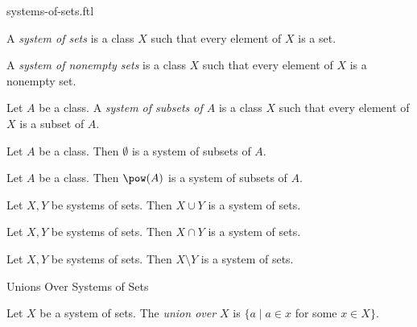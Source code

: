 \documentclass{naproche-library}
\begin{document}
\begin{smodule}[title=Systems of Sets]{systems-of-sets.ftl}

\begin{definition}[forthel,id=FOUNDATIONS_10_5805323570905088]
  A \emph{system of sets} is a class $X$ such that every element of $X$ is a set.
\end{definition}

\begin{definition}[forthel,id=FOUNDATIONS_10_1631952387964928]
  A \emph{system of nonempty sets} is a class $X$ such that every element of $X$ is a nonempty set.
\end{definition}

\begin{definition}[forthel,id=FOUNDATIONS_10_943381479948288]
  Let $A$ be a class.
  A \emph{system of subsets of $A$} is a class $X$ such that every element of $X$ is a subset of $A$.
\end{definition}

\begin{proposition}[forthel,id=FOUNDATIONS_10_8268633648136192]
  Let $A$ be a class.
  Then $\emptyset$ is a system of subsets of $A$.
\end{proposition}

\begin{proposition}[forthel,id=FOUNDATIONS_10_7546016869908480]
  Let $A$ be a class.
  Then $\pow(A)$ is a system of subsets of $A$.
\end{proposition}

\begin{proposition}
  Let $X, Y$ be systems of sets.
  Then $X \cup Y$ is a system of sets.
\end{proposition}

\begin{proposition}
  Let $X, Y$ be systems of sets.
  Then $X \cap Y$ is a system of sets.
\end{proposition}

\begin{proposition}
  Let $X, Y$ be systems of sets.
  Then $X \setminus Y$ is a system of sets.
\end{proposition}

\begin{sfragment}{Unions Over Systems of Sets}
  \begin{definition}[forthel,id=FOUNDATIONS_10_541772562300928]
    Let $X$ be a system of sets.
    The \emph{union over $X$} is $\{ a \mid a \in x$ for some $x \in X \}$.


\end{definition}
\end{sfragment}
\end{smodule}
\end{document}
